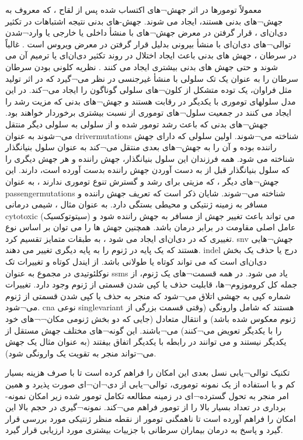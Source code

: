 معمولاً تومورها در اثر جهش¬های اکتساب شده پس از لقاح ، که معروف به جهش¬های بدنی هستند، ایجاد می شوند. جهش-های بدنی نتیجه اشتباهات در تکثیر دی‌ان‌ای \cite{behjati2014genome} ، قرار گرفتن در معرض جهش¬های با منشأ داخلی یا خارجی یا وارد¬شدن توالی¬های دی‌ان‌ای با منشأ بیرونی بدلیل قرار گرفتن در معرض ویروس است \cite{talbot2004viruses}. غالباً در سرطان ، جهش های بدنی باعث ایجاد اختلال در روند تکثیر دی‌ان‌ای یا ترمیم آن می شوند و حتی جهش های بدنی بیشتری ایجاد می کنند \cite{stratton2009cancer}. نظریه کلونی بودن سرطان \cite{nowell1976clonal} سرطان را به عنوان یک تک سلولی با منشأ غیرجنسی در نظر می¬گیرد که در اثر تولید مثل فراوان، یک توده متشکل از کلون¬های سلولی گوناگون را ایجاد می¬کند. در این مدل سلولهای توموری با یکدیگر در رقابت هستند و جهش¬های بدنی که مزیت رشد را ایجاد می کنند در جمعیت سلول¬های توموری از نسبت بیشتری برخوردار خواهند بود. جهش¬های بدنی که باعث رشد تومور شده و از سلولی به سلولی دیگر منتقل می¬شوند به عنوان \glspl{drivermutation} شناخته می¬شوند. اولین سلولی که دارای جهش راننده بوده و آن را به جهش¬های بعدی منتقل می¬کند به عنوان سلول بنیانگذار شناخته می شود. همه فرزندان این سلول بنیانگذار، جهش راننده و هر جهش دیگری را که سلول بنیانگذار قبل از به دست آوردن جهش راننده بدست آورده است، دارند. این جهش¬های دیگر ، که مزیتی برای رشد و گسترش تنوع توموری ندارند ، به عنوان \glspl{passengermutation} شناخته می¬شوند. شایان ذکر است که تعریف جهش راننده و مسافر به زمینه ژنتیکی و محیطی بستگی دارد. به عنوان مثال ، شیمی درمانی \gls{cytotoxic}  (سیتوتوکسیک) می تواند باعث تغییر جهش از مسافر به جهش راننده شود و عامل اصلی مقاومت در برابر درمان باشد. همچنین جهش ها را می توان بر اساس نوع تغییری که در دی‌ان‌ای ایجاد می شود ، به طبقات متمایز تقسیم کرد. \gls{snv} جهش¬هایی هستند که یک پایه در ژنوم را به پایه دیگری تغییر می دهند. \gls{indel}  درج یا حذف یک بخش دی‌ان‌ای است که می تواند کوتاه یا طولانی باشد. از ایندل کوتاه و تغییرات تک نوکلئوتیدی در مجموع به عنوان \glspl{ssm}  یاد می شود. در همه قسمت¬های یک ژنوم، از جمله کل کروموزوم¬ها، قابلیت حذف یا کپی شدن قسمتی از ژنوم وجود دارد. تغییرات شماره کپی  به جهشی اتلاق می¬شود که منجر به حذف یا کپی شدن قسمتی از ژنوم می¬شود. \gls{cna} نوعی \gls{singlevariant} هستند که شامل وارونگی (وقتی قسمت بزرگی از ژنوم معکوس شده باشد) و انتقال متعادل (جایی که دو بخش ژنومی مکان¬¬های خود را با یکدیگر تعویض می¬کنند) می¬باشند\cite{stratton2009cancer}. این گونه¬های مختلف جهش مستقل از یکدیگر نیستند و می توانند در رابطه با یکدیگر اتفاق بیفتند (به عنوان مثال یک جهش می¬تواند منجر به تقویت یک وارونگی شود). 



تکنیک توالی¬یابی نسل بعدی این امکان را فراهم کرده است تا با صرف هزینه بسیار کم و با استفاده از یک نمونه توموری، توالی¬یابی از دی¬ان¬ای صورت پذیرد و همین امر منجر به تحول گسترده¬ای در زمینه مطالعه تکامل تومور شده زیر امکان نمونه-برداری در تعداد بسیار بالا را از تومور فراهم می¬کند. نمونه¬گیری در حجم بالا این امکان را فراهم آورده است تا ناهمگنی تومور از نقطه منظر ژنتیکی مورد بررسی قرار گیرد و پاسخ به درمان بیماران سرطانی با جزییات بیشتری مورد ارزیابی قرار گیرد.


